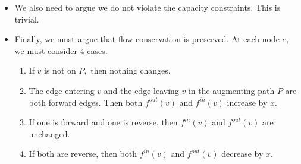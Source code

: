 \documentclass[a4paper,12pt]{article}
\begin{document}
\begin{itemize}
    \item We also need to argue we do not violate the capacity constraints. This is trivial.
    \item Finally, we must argue that flow conservation is preserved. At each node $e,$ we must consider $4$ cases. \begin{enumerate}
        \item If $v$ is not on $P,$ then nothing changes.
        \item The edge entering $v$ and the edge leaving $v$ in the augmenting path $P$ are both forward edges. Then both $f^{out}(v)$ and $f^{in}(v)$ increase by $x.$
        \item If one is forward and one is reverse, then $f^{in}(v)$ and $f^{out}(v)$ are unchanged.
        \item If both are reverse, then both $f^{in}(v)$ and $f^{out}(v)$ decrease by $x.$
    \end{enumerate}
\end{itemize}
\end{document}
